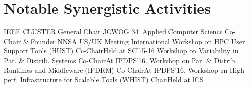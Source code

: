 \section{Notable Synergistic Activities}
        {IEEE CLUSTER}
        {General Chair}
        {}{}{}
		{JOWOG 34: Applied Computer Science}
		{Co-Chair \& Founder}
		{NNSA US/UK Meeting}{}{}
		{International Workshop on HPC User Support Tools (HUST)}
		{Co-Chair}{Held at SC'15-16}{}{}
		{Workshop on Variability in Par. \& Distrib. Systems}
		{Co-Chair}{At IPDPS'16.}{}{}
		{Workshop on Par. \& Distrib. Runtimes and Middleware (IPDRM)}
		{Co-Chair}{At IPDPS'16.}{}{}
		{Workshop on High-perf. Infrastructure for Scalable Tools (WHIST)}
		{Chair}{Held at ICS}{}{}{}
